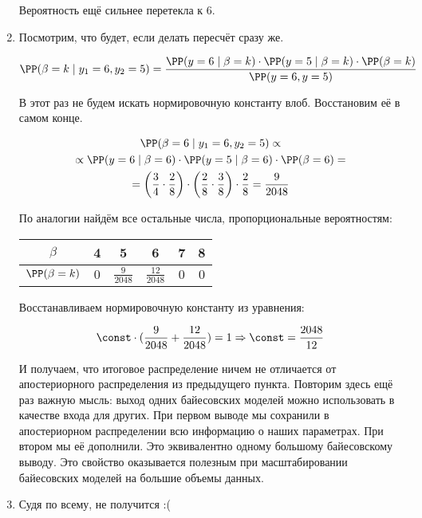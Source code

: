 \begin{problem}
\begin{sol}
\begin{enumerate}
	Вероятность ещё сильнее перетекла к $6$. 
	
	\item Посмотрим, что будет, если делать пересчёт сразу же. 
	
	\[ \PP(\beta = k \mid y_1 = 6, y_2 = 5) = \frac{\PP(y = 6 \mid \beta = k) \cdot \PP(y = 5 \mid \beta = k) \cdot \PP(\beta = k) }{ \PP(y=6, y=5)}\]
	
	В этот раз не будем искать нормировочную константу влоб. Восстановим её в самом конце. 
	
	\begin{multline*}
	\PP(\beta = 6 \mid y_1 = 6, y_2 = 5) \propto \\ \propto \PP(y = 6 \mid \beta = 6) \cdot \PP(y = 5 \mid \beta = 6) \cdot \PP(\beta = 6) = \\ = \left(\frac{3}{4} \cdot \frac{2}{8} \right)\cdot \left( \frac{2}{8} \cdot \frac{3}{8} \right) \cdot \frac{2}{8} = \frac{9}{2048}
	\end{multline*}
	
	По аналогии найдём все остальные числа, пропорциональные вероятностям: 
	
	\begin{center}
		\begin{tabular}{c|c|c|c|c|c}
			$\beta$ & 4 & 5 & 6 & 7 & 8 \\ \hline
			$\PP(\beta = k)$ & $0 $ & $ \frac{9}{2048}$ &  $ \frac{12}{2048}$ &  $ 0$ &  $0$ \\ 
		\end{tabular}
	\end{center}
	
	Восстанавливаем нормировочную константу из уравнения:
	
	\[ \const \cdot ( \frac{9}{2048} + \frac{12}{2048}) = 1 \Rightarrow \const = \frac{2048}{12} \]
	
	И получаем, что итоговое распределение ничем не отличается от апостериорного распределения из предыдущего пункта.  Повторим здесь ещё раз важную мысль: выход одних байесовских моделей можно использовать в качестве входа для других. При первом выводе мы сохранили в апостериорном распределении всю информацию о наших параметрах. При втором мы её дополнили. Это эквивалентно одному большому байесовскому выводу. Это свойство оказывается полезным при масштабировании байесовских моделей на большие объемы данных. 
	
	\item Судя по всему, не получится :( 
\end{enumerate} 
	\end{sol}
\end{problem}


